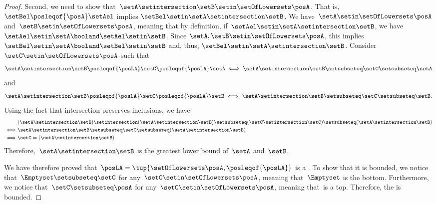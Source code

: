 \begin{proof}
    Second, we need to show that~$\setA \setintersection \setB\setin \setOfLowersets \posA$. That is, $\setBel \posleqof{\posA} \setAel$ implies $\setBel \setin \setA\setintersection \setB$.
    We have~$\setA \setin \setOfLowersets \posA$ and~$\setB\setin \setOfLowersets \posA$, meaning that by definition, if~$\setAel\setin \setA\setintersection \setB$, we have~$\setAel \setin \setA\booland \setAel\setin \setB$. Since $\setA,\setB \setin \setOfLowersets\posA$, this implies $\setBel \setin \setA\booland \setBel\setin \setB$ and, thus, $\setBel \setin \setA\setintersection\setB$.
    Consider~$\setC\setin \setOfLowersets \posA$ such that
\[
    \setA\setintersection \setB\posleqof{\posLA} \setC\posleqof{\posLA} \setA
\iff
    \setA\setintersection \setB\setsubseteq \setC\setsubseteq \setA
\]
and
\[
    \setA\setintersection \setB\posleqof{\posLA} \setC\posleqof{\posLA} \setB
\iff
    \setA\setintersection \setB\setsubseteq \setC\setsubseteq \setB.
\]
    Using the fact that intersection preserves inclusions, we have
    \begin{equation}
        \begin{aligned}
            &(\setA\setintersection \setB)
            \setintersection (\setA\setintersection \setB)  \setsubseteq (\setC \setintersection \setC) \setsubseteq (\setA\setintersection \setB) \\
            \iff&\setA\setintersection \setB                    \setsubseteq \setC\setsubseteq (\setA\setintersection \setB) \\
            \iff&\setC                                           =(\setA\setintersection \setB).
        \end{aligned}
    \end{equation}
    Therefore,~$\setA\setintersection \setB$ is the greatest lower bound of~$\setA$ and~$\setB$.

    We have therefore proved that~$\posLA=\tup{\setOfLowersets \posA, \posleqof{\posLA}}$ is a .
    To show that it is bounded, we notice that~$\Emptyset \setsubseteq \setC$ for any~$\setC\setin \setOfLowersets \posA$, meaning that~$\Emptyset$ is the bottom.
    Furthermore, we notice that~$\setC\setsubseteq \posA$ for any~$\setC\setin \setOfLowersets \posA$, meaning that~\posA is a top.
    Therefore, the  is bounded.
\end{proof}

\vfill

